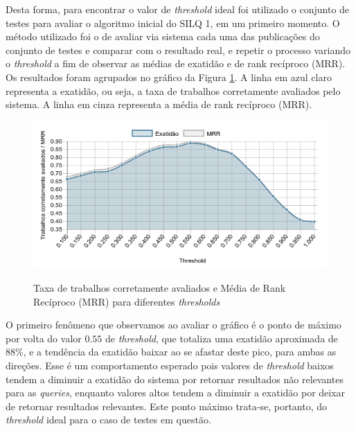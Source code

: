 \documentclass[12pt]{article}
\begin{document}
 Desta forma, para encontrar o valor de \textit{threshold} ideal foi utilizado o conjunto de testes para avaliar o algoritmo inicial do SILQ 1, em um primeiro momento. O método utilizado foi o de avaliar via sistema cada uma das publicações do conjunto de testes e comparar com o resultado real, e repetir o processo variando o \textit{threshold} a fim de observar as médias de exatidão e de rank recíproco (MRR). Os resultados foram agrupados no gráfico da Figura \ref{fig:avaliacao-threshold}. A linha em azul claro representa a exatidão, ou seja, a taxa de trabalhos corretamente avaliados pelo sistema. A linha em cinza representa a média de rank recíproco (MRR).

 \begin{figure}[!h]
    \centering
    \caption{Taxa de trabalhos corretamente avaliados e Média de Rank Recíproco (MRR) para diferentes \textit{thresholds}}
    \includegraphics[width=\textwidth]{../figuras/avaliacao-threshold.png}
    \label{fig:avaliacao-threshold}
 \end{figure}

O primeiro fenômeno que observamos ao avaliar o gráfico é o ponto de máximo por volta do valor $0.55$ de \textit{threshold}, que totaliza uma exatidão aproximada de 88\%, e a tendência da exatidão baixar ao se afastar deste pico, para ambas as direções. Esse é um comportamento esperado pois valores de \textit{threshold} baixos tendem a diminuir a exatidão do sistema por retornar resultados não relevantes para as \textit{queries}, enquanto valores altos tendem a diminuir a exatidão por deixar de retornar resultados relevantes. Este ponto máximo trata-se, portanto, do \textit{threshold} ideal para o caso de testes em questão.
\end{document}
